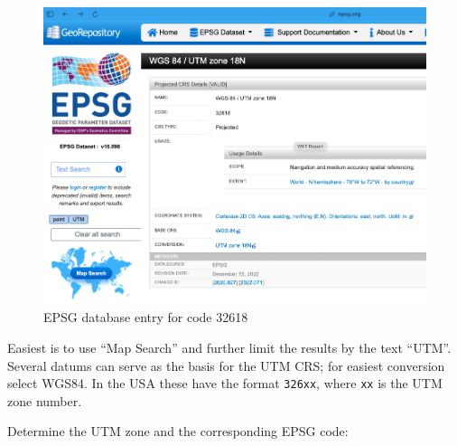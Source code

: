 \documentclass[
  letterpaper,
  DIV=11,
  numbers=noendperiod]{scrartcl}
\newenvironment{Shaded}{\begin{snugshade}}{\end{snugshade}}
\newcommand{\CommentTok}[1]{\textcolor[rgb]{0.37,0.37,0.37}{#1}}
\newcommand{\ControlFlowTok}[1]{\textcolor[rgb]{0.00,0.23,0.31}{#1}}
\newcommand{\DecValTok}[1]{\textcolor[rgb]{0.68,0.00,0.00}{#1}}
\newcommand{\FloatTok}[1]{\textcolor[rgb]{0.68,0.00,0.00}{#1}}
\newcommand{\FunctionTok}[1]{\textcolor[rgb]{0.28,0.35,0.67}{#1}}
\newcommand{\NormalTok}[1]{\textcolor[rgb]{0.00,0.23,0.31}{#1}}
\newcommand{\OtherTok}[1]{\textcolor[rgb]{0.00,0.23,0.31}{#1}}
\newcommand{\SpecialCharTok}[1]{\textcolor[rgb]{0.37,0.37,0.37}{#1}}
\newcommand{\StringTok}[1]{\textcolor[rgb]{0.13,0.47,0.30}{#1}}
\begin{document}
\begin{figure}

{\centering \includegraphics{./figs/EPSG32618screen.png}

}

\caption{\label{fig-epsg}EPSG database entry for code 32618}

\end{figure}

Easiest is to use ``Map Search'' and further limit the results by the
text ``UTM''. Several datums can serve as the basis for the UTM CRS; for
easiest conversion select WGS84. In the USA these have the format
\texttt{326xx}, where \texttt{xx} is the UTM zone number.

Determine the UTM zone and the corresponding EPSG code:

\begin{Shaded}
\end{Shaded}
\end{document}
